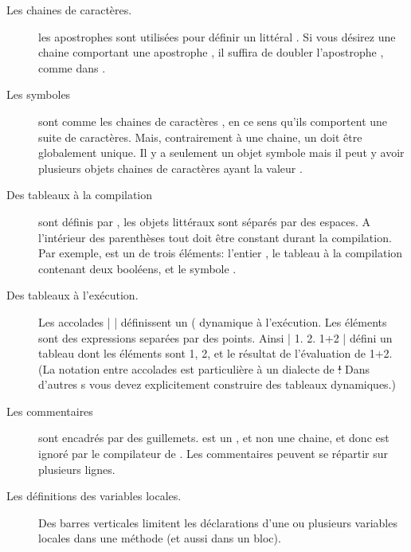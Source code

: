 \documentclass[a4paper,10pt,twoside]{book}
\begin{document}
\begin{description}
\item[Les chaines de caract\`{e}res.] les apostrophes sont utilis\'{e}es pour d\'{e}finir un  litt\'{e}ral .
Si vous d\'{e}sirez une chaine comportant une apostrophe , il suffira de doubler l'apostrophe , comme dans .

\item[Les symboles] sont comme les chaines de caract\`{e}res , en ce sens qu'ils comportent une suite de caract\`{e}res.  
Mais, contrairement \`{a} une chaine, un  doit \^{e}tre globalement unique.
Il y a seulement un objet symbole  mais il peut y avoir plusieurs objets chaines de caract\`{e}res ayant la valeur .

\item[Des tableaux \`{a} la compilation] sont d\'{e}finis par \ct{#( )}, les objets litt\'{e}raux sont s\'{e}par\'{e}s par des espaces.
A l'int\'{e}rieur des parenth\`{e}ses tout doit \^{e}tre constant durant la compilation.
Par exemple,   est un  de trois \'{e}l\'{e}ments: l'entier , le tableau \`{a} la compilation contenant deux bool\'{e}ens, et le symbole .

\item[Des tableaux \`{a} l'ex\'{e}cution.] Les accolades \ct|{ }| d\'{e}finissent un ( {dynamique} \`{a} l'ex\'{e}cution.
Les \'{e}l\'{e}ments sont des expressions separ\'{e}es par des points.
Ainsi \ct|{ 1. 2. 1+2 }| d\'{e}fini un tableau dont les \'{e}l\'{e}ments sont 1, 2, et le r\'{e}sultat de l'\'{e}valuation de 1+2.
(La notation entre accolades est particuli\`{e}re \`{a} \sq un dialecte de \st!
Dans d'autres \st{}s vous devez explicitement construire des tableaux dynamiques.)

\item[Les commentaires] sont encadr\'{e}s par des guillemets.
 est un , et non une chaine, et donc est ignor\'{e} par le compilateur de \sq.
Les commentaires peuvent se r\'{e}partir sur plusieurs lignes.
		
\item[Les d\'{e}finitions des variables locales.] Des barres verticales \ct{| |} limitent les  {d\'{e}clarations} d'une ou plusieurs variables locales dans une m\'{e}thode (et aussi dans un bloc).


\end{description}
\end{document}
